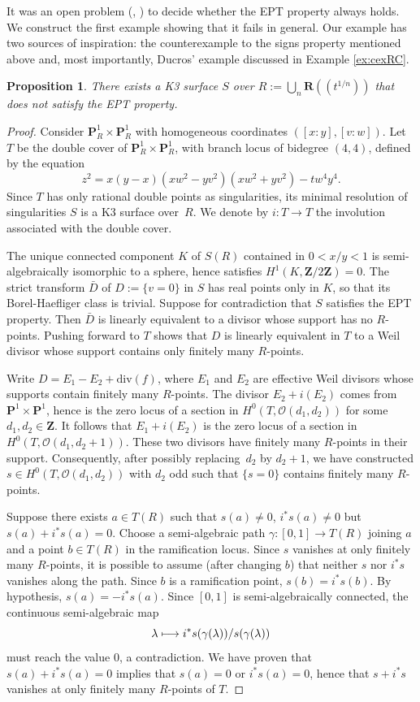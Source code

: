 \documentclass[JEP,XML,SOM,Unicode]{cedram}
\newcommand\mto{\mathchoice{\longmapsto}{\mapsto}{\mapsto}{\mapsto}}
\newcommand{\lpr}{(\!(}
\newcommand{\rpr}{)\!)}
\theoremstyle{plain}
\newtheorem{prop}[thm]{Proposition}
\theoremstyle{definition}
\numberwithin{equation}{section}
\newcommand{\sO}{{\mathscr O}}
\renewcommand{\P}{{\mathbf P}}
\newcommand{\R}{{\mathbf R}}
\newcommand{\Z}{{\mathbf Z}}
\newcommand{\divi}{\mathrm{div}}
\begin{document}
It was an open problem (\cite[p.\,309]{IS}, \cite[(4.2)]{scheidererpurity}) to decide whether the EPT property always holds. We construct the first example showing that it fails in general. Our example has two sources of inspiration: the counterexample \cite[Ex.\,15.2.2]{bcr} to the signs property mentioned above and, most importantly, Ducros' example \hbox{\cite[\S 8]{ducros}} discussed in Example \ref{ex:cexRC}.

\begin{prop}
\label{prop:cexEPT}
There exists a K3 surface $S$ over $R:=\bigcup_n\R\lpr t^{1/n}\rpr$ that does not satisfy the EPT property.
\end{prop}

\begin{proof}
Consider $\P^1_R\times \P^1_R$ with homogeneous coordinates $([x:y],[v:w])$.
Let $T$ be the double cover of $\P^1_R\times\P^1_R$, with branch locus of bidegree $(4,4)$, defined by the equation
\[
z^2=x(y-x)(xw^2-yv^2)(xw^2+yv^2)-tw^4y^4.
\]
Since $T$ has only rational double points as singularities, its minimal resolution of singularities $S$ is a K3 surface over~$R$. We denote by $i:T\to T$ the involution associated with the double cover.

The unique connected component $K$ of $S(R)$ contained in $0<x/y<1$ is semi-algebraically isomorphic to a sphere, hence satisfies $H^1(K,\Z/2\Z)=0$. The strict transform $\bar{D}$ of $D:=\{v=0\}$ in $S$ has real points only in $K$, so that its Borel-Haefliger class is trivial. Suppose for contradiction that $S$ satisfies the EPT property. Then $\bar{D}$ is linearly equivalent to a divisor whose support has no $R$-points. Pushing forward to $T$ shows that $D$ is linearly equivalent in $T$ to a Weil divisor whose support contains only finitely many $R$-points.

Write $D=E_1-E_2+\divi(f)$, where $E_1$ and $E_2$ are effective Weil divisors whose supports contain finitely many $R$-points. The divisor $E_2+i(E_2)$ comes from $\P^1\times \P^1$, hence is the zero locus of a section in $H^0(T,\sO(d_1,d_2))$ for some $d_1, d_2\in\Z$. It follows that $E_1+i(E_2)$ is the zero locus of a section in $H^0(T,\sO(d_1,d_2+1))$. These two divisors have finitely many $R$-points in their support. Consequently, after possibly replacing~$d_2$ by $d_2+1$, we have constructed $s\in H^0(T,\sO(d_1,d_2))$ with $d_2$ odd such that $\{s=0\}$ contains finitely many $R$-points.

Suppose there exists $a\in T(R)$ such that $s(a)\neq 0$, $i^*s(a)\neq 0$ but $s(a)+i^*s(a)=0$. Choose a semi-algebraic path $\gamma:[0,1]\to T(R)$ joining $a$ and a point $b\in T(R)$ in the ramification locus. Since $s$ vanishes at only finitely many $R$-points, it is possible to assume (after changing $b$) that neither $s$ nor $i^*s$ vanishes along the path. Since $b$ is a ramification point, $s(b)=i^*s(b)$. By hypothesis, $s(a)=-i^*s(a)$.
Since $[0,1]$ is semi-algebraically connected,
the continuous semi-algebraic map
\[
\lambda\mto i^*s(\gamma(\lambda))/s(\gamma(\lambda))
\]
must reach the value $0$, a contradiction. We have proven that $s(a)+i^*s(a)=0$ implies that $s(a)=0$ or $i^*s(a)=0$, hence that $s+i^*s$ vanishes at only finitely many $R$-points of $T$.


\end{proof}
\end{document}
